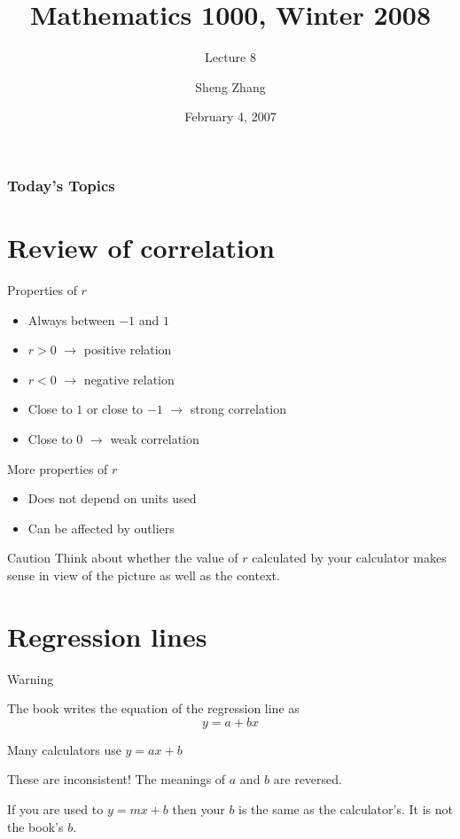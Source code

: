 \documentclass{beamer}
\title[Lecture 8] %
{Mathematics 1000, Winter 2008}
\subtitle
{Lecture 8} %
\author[S Zhang] %
{Sheng Zhang} %
\date[Short Occasion] %
{February 4, 2007}
\begin{document}
\begin{frame}
  \titlepage
\end{frame}

\begin{frame}
  \frametitle{Today's Topics}
  \tableofcontents
\end{frame}

\section{Review of correlation}

\begin{frame}{Properties of $r$}
\begin{itemize}
\item
Always between $-1$ and $1$
\vfill
\item
$r > 0 $  $\longrightarrow$  positive relation
\item
$r < 0 $  $\longrightarrow$  negative relation
\vfill
\smallskip
\item
Close to $1$ or close to $-1$ $\longrightarrow$  strong correlation
\item
Close to $0$ $\longrightarrow$ weak correlation
\end{itemize}
\end{frame}

\begin{frame}{More properties of $r$}
\begin{itemize}
\item
Does not depend on units used
\pause
\vfill
\item Can be affected by outliers
\end{itemize}
\end{frame}

\begin{frame}{Caution}
Think about whether the value of
$r$ calculated by your calculator makes sense in view of
the picture as well as the context.
\end{frame}

\section{Regression lines}

\begin{frame}{Warning}

The book writes the equation of the regression line as
                                  $$y = a + bx$$

Many calculators use    $y = ax + b$

\vfill
\alert{These are inconsistent!}  The meanings of $a$ and $b$
are reversed.

\vfill
If you are used to    $y = mx + b$  then your $b$ is
the same as the calculator's.  It is not the book's $b$.  
\end{frame}
\end{document}
